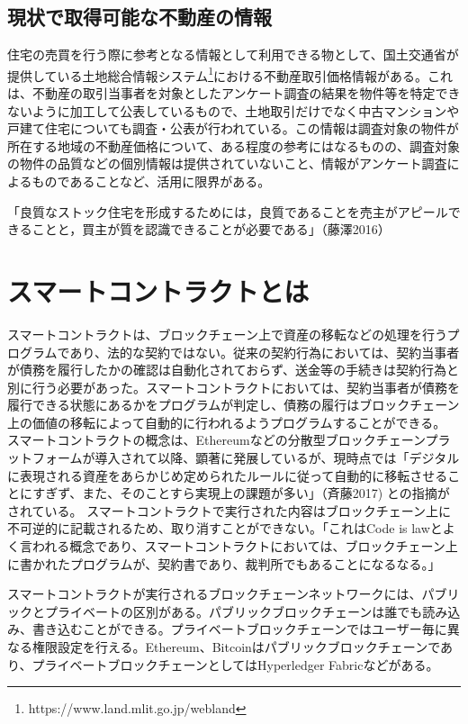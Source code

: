 \documentclass[a4paper,11pt]{jlreq}
\begin{document}
\subsection{現状で取得可能な不動産の情報}
住宅の売買を行う際に参考となる情報として利用できる物として、国土交通省が提供している土地総合情報システム\footnote{https://www.land.mlit.go.jp/webland}における不動産取引価格情報がある。これは、不動産の取引当事者を対象としたアンケート調査の結果を物件等を特定できないように加工して公表しているもので、土地取引だけでなく中古マンションや戸建て住宅についても調査・公表が行われている。この情報は調査対象の物件が所在する地域の不動産価格について、ある程度の参考にはなるものの、調査対象の物件の品質などの個別情報は提供されていないこと、情報がアンケート調査によるものであることなど、活用に限界がある。

「良質なストック住宅を形成するためには，良質であることを売主がアピールできることと，買主が質を認識できることが必要である」（藤澤2016）%

\section{スマートコントラクトとは}
スマートコントラクトは、ブロックチェーン上で資産の移転などの処理を行うプログラムであり、法的な契約ではない。従来の契約行為においては、契約当事者が債務を履行したかの確認は自動化されておらず、送金等の手続きは契約行為と別に行う必要があった。スマートコントラクトにおいては、契約当事者が債務を履行できる状態にあるかをプログラムが判定し、債務の履行はブロックチェーン上の価値の移転によって自動的に行われるようプログラムすることができる。
スマートコントラクトの概念は、Ethereumなどの分散型ブロックチェーンプラットフォームが導入されて以降、顕著に発展しているが、現時点では「デジタルに表現される資産をあらかじめ定められたルールに従って自動的に移転させることにすぎず、また、そのことすら実現上の課題が多い」（斉藤2017)
との指摘がされている。
スマートコントラクトで実行された内容はブロックチェーン上に不可逆的に記載されるため、取り消すことができない。「これはCode is lawとよく言われる概念であり、スマートコントラクトにおいては、ブロックチェーン上に書かれたプログラムが、契約書であり、裁判所でもあることになるなる。」


スマートコントラクトが実行されるブロックチェーンネットワークには、パブリックとプライベートの区別がある。パブリックブロックチェーンは誰でも読み込み、書き込むことができる。プライベートブロックチェーンではユーザー毎に異なる権限設定を行える。Ethereum、Bitcoinはパブリックブロックチェーンであり、プライベートブロックチェーンとしてはHyperledger Fabricなどがある。
\end{document}
